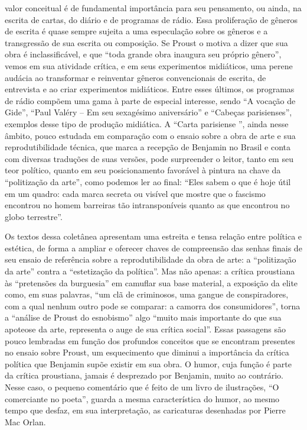 valor conceitual é de fundamental importância para seu pensamento, ou
ainda, na escrita de cartas, do diário e de programas de rádio. Essa
proliferação de gêneros de escrita é quase sempre sujeita a uma
especulação sobre os gêneros e a transgressão de sua escrita ou
composição. Se Proust o motiva a dizer que sua obra é inclassificável, e
que ``toda grande obra inaugura seu próprio gênero'', vemos em sua
atividade crítica, e em seus experimentos midiáticos, uma perene audácia
ao transformar e reinventar gêneros convencionais de escrita, de
entrevista e ao criar experimentos midiáticos. Entre esses últimos, os
programas de rádio compõem uma gama à parte de especial interesse, sendo
``A vocação de Gide'', ``Paul Valéry -- Em seu sexagésimo aniversário''
e ``Cabeças parisienses'', exemplos desse tipo de produção midiática. A
``Carta parisiense '', ainda nesse âmbito, pouco estudada em comparação
com o ensaio sobre a obra de arte e sua reprodutibilidade técnica, que
marca a recepção de Benjamin no Brasil e conta com diversas traduções de
suas versões, pode surpreender o leitor, tanto em seu teor político,
quanto em seu posicionamento favorável à pintura na chave da
``politização da arte'', como podemos ler ao final: ``Eles sabem o que é hoje útil
em um quadro: cada marca secreta ou visível que mostre que o fascismo
encontrou no homem barreiras tão intransponíveis quanto as que encontrou no globo
terrestre''.

Os textos dessa coletânea apresentam uma estreita e tensa relação entre
política e estética, de forma a ampliar e oferecer chaves de compreensão
das senhas finais de seu ensaio de referência sobre a reprodutibilidade
da obra de arte: a ``politização da arte'' contra a ``estetização da
política''. Mas não apenas: a crítica proustiana às ``pretensões da
burguesia'' em camuflar sua base material, a exposição da elite como, em
suas palavras, ``um clã de criminosos, uma gangue de conspiradores, com
a qual nenhum outro pode se comparar: a camorra dos consumidores'',
torna a ``análise de Proust do esnobismo'' algo ``muito mais importante
do que sua apoteose da arte, representa o auge de sua crítica social''.
Essas passagens são pouco lembradas em função dos profundos conceitos
que se encontram presentes no ensaio sobre Proust, um esquecimento que
diminui a importância da crítica política que Benjamin supõe existir em
sua obra. O humor, cuja função é parte da crítica proustiana, jamais é
desprezado por Benjamin, muito ao contrário. Nesse caso, o pequeno
comentário que é feito de um livro de ilustrações, ``O comerciante no
poeta'', guarda a mesma característica do humor, ao mesmo tempo que
desfaz, em sua interpretação, as caricaturas desenhadas por Pierre Mac
Orlan.


